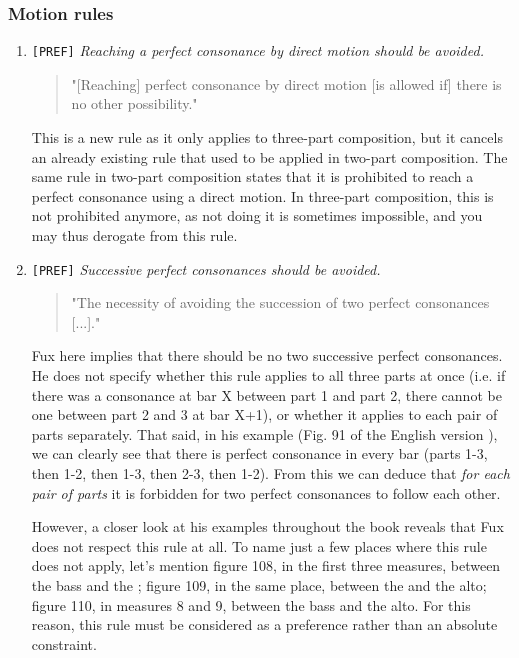 \subsubsection{Motion rules}
\begin{enumerate}[wide, label=\bfseries 1.P\arabic*]
    \item\label{rule:direct-to-p-cons} \greendots \texttt{[PREF]}  \textit{Reaching a perfect consonance by direct motion should be avoided.}

    \begin{quotation}
    "[Reaching] perfect consonance by direct motion [is allowed if] there is no other possibility."
    \textcite[p.77]{GaPEng}
    \end{quotation}

    This is a new rule as it only applies to three-part composition, but it cancels an already existing rule that used to be applied in two-part composition. The same rule in two-part composition states that it is prohibited to reach a perfect consonance using a direct motion. In three-part composition, this is not prohibited anymore, as not doing it is sometimes impossible, and you may thus derogate from this rule.

\setcounter{enumi}{3} %
    \item\label{rule:succ-p-cons} \texttt{[PREF]} \textit{Successive perfect consonances should be avoided.}

    \begin{quotation}
    "The necessity of avoiding the succession of two perfect consonances [...]."
    \textcite[p.72]{GaPEng}
    \end{quotation}

    Fux here implies that there should be no two successive perfect consonances. He does not specify whether this rule applies to all three parts at once (i.e. if there was a consonance at bar X between part 1 and part 2, there cannot be one between part 2 and 3 at bar X+1), or whether it applies to each pair of parts separately. That said, in his example (Fig. 91 of the English version \cite{GaPEng}), we can clearly see that there is perfect consonance in every bar (parts 1-3, then 1-2, then 1-3, then 2-3, then 1-2). From this we can deduce that \textit{for each pair of parts} it is forbidden for two perfect consonances to follow each other.

    However, a closer look at his examples throughout the book reveals that Fux does not respect this rule at all. To name just a few places where this rule does not apply, let's mention figure 108, in the first three measures, between the bass and the \cf; figure 109, in the same place, between the \cf and the alto; figure 110, in measures 8 and 9, between the bass and the alto. For this reason, this rule must be considered as a preference rather than an absolute constraint.


\end{enumerate}
